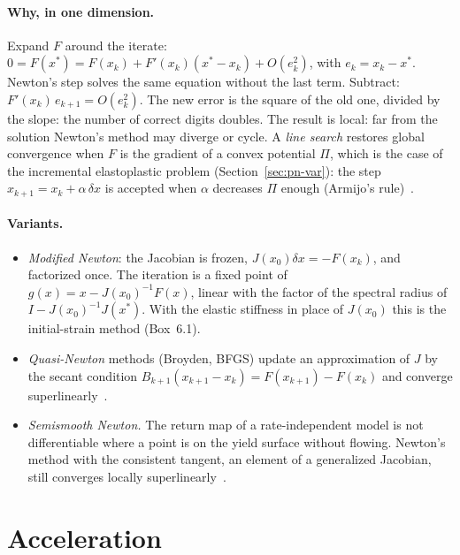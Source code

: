 \paragraph{Why, in one dimension.} Expand $F$ around the iterate: $0=F(x^\ast)=F(x_k)+F'(x_k)(x^\ast-x_k)+O(e_k^2)$,
with $e_k=x_k-x^\ast$. Newton's step solves the same equation without the last
term. Subtract: $F'(x_k)\,e_{k+1}=O(e_k^2)$. The new error is the square of the
old one, divided by the slope: the number of correct digits doubles.
The result is local: far from the solution Newton's method may diverge or
cycle. A \emph{line search} restores global convergence when $F$ is the
gradient of a convex potential $\Pi$, which is the case of the incremental
elastoplastic problem (Section~\ref{sec:pn-var}): the step
$x_{k+1}=x_k+\alpha\,\delta x$ is accepted when $\alpha$ decreases $\Pi$
enough (Armijo's rule)~\cite[Ch.~6]{DennisSchnabel1983}.

\paragraph{Variants.}
%
\begin{itemize}
  \item \emph{Modified Newton}: the Jacobian is frozen, $J(x_0)\delta x=-F(x_k)$,
  and factorized once. The iteration is a fixed point of
  $g(x)=x-J(x_0)^{-1}F(x)$, linear with the factor of the spectral radius of
  $I-J(x_0)^{-1}J(x^\ast)$. With the elastic stiffness in place of $J(x_0)$
  this is the initial-strain method (Box~6.1).
  \item \emph{Quasi-Newton} methods (Broyden, BFGS) update an approximation of
  $J$ by the secant condition $B_{k+1}(x_{k+1}-x_k)=F(x_{k+1})-F(x_k)$ and
  converge superlinearly~\cite{DennisSchnabel1983}.
  \item \emph{Semismooth Newton.} The return map of a rate-independent model is
  not differentiable where a point is on the yield surface without flowing.
  Newton's method with the consistent tangent, an element of a generalized
  Jacobian, still converges locally superlinearly~\cite{QiSun1993,SauterWieners2011b}.
\end{itemize}

\section{Acceleration}\label{sec:it-accel}
%
